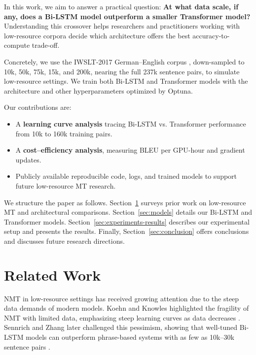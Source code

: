 \documentclass{article}
\begin{document}
In this work, we aim to answer a practical question: \textbf{At what data scale, if any, does a Bi-LSTM model outperform a smaller Transformer model?} Understanding this crossover helps researchers and practitioners working with low-resource corpora decide which architecture offers the best accuracy-to-compute trade-off.

Concretely, we use the IWSLT-2017 German–English corpus \citep{cettolo-etal-2017-overview}, down-sampled to 10k, 50k, 75k, 15k, and 200k, nearing the full 237k sentence pairs, to simulate low-resource settings. We train both Bi-LSTM and Transformer models with the architecture and other hyperparameters optimized by Optuna.

Our contributions are:
\begin{itemize}
  \setlength{\itemsep}{0pt}
  \item A \textbf{learning curve analysis} tracing Bi-LSTM vs. Transformer performance from 10k to 160k training pairs.
  \item A \textbf{cost–efficiency analysis}, measuring BLEU per GPU-hour and gradient updates.
  \item Publicly available reproducible code, logs, and trained models to support future low-resource MT research.
\end{itemize}

We structure the paper as follows. Section~\ref{sec:related-work} surveys prior work on low-resource MT and architectural comparisons. Section~\ref{sec:models} details our Bi-LSTM and Transformer models. Section~\ref{sec:experiments-results} describes our experimental setup and presents the results. Finally, Section~\ref{sec:conclusion} offers conclusions and discusses future research directions.


\section{Related Work}
\label{sec:related-work}

NMT in low-resource settings has received growing attention due to the steep data demands of modern models. Koehn and Knowles highlighted the fragility of NMT with limited data, emphasizing steep learning curves as data decreases \citep{koehn2017challengesneuralmachinetranslation}. Sennrich and Zhang later challenged this pessimism, showing that well-tuned Bi-LSTM models can outperform phrase-based systems with as few as 10k–30k sentence pairs \citep{sennrich2019revisitinglowresourceneuralmachine}. 
\end{document}
